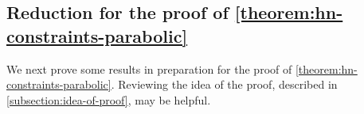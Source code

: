 \documentclass[12 pt]{amsart}
\theoremstyle{plain}
\theoremstyle{definition}
\theoremstyle{remark}
\numberwithin{equation}{section}
\newcommand*{\sheafend}{\mathscr{E}\kern -1pt nd}
\begin{document}
\subsection{Reduction for the proof of \autoref{theorem:hn-constraints-parabolic}}
\label{subsection:proving-hn}
We next prove some results in preparation for the proof of
\autoref{theorem:hn-constraints-parabolic}. 
Reviewing the idea of the proof, described in \autoref{subsection:idea-of-proof},
may be helpful.
%
%
\end{document}
